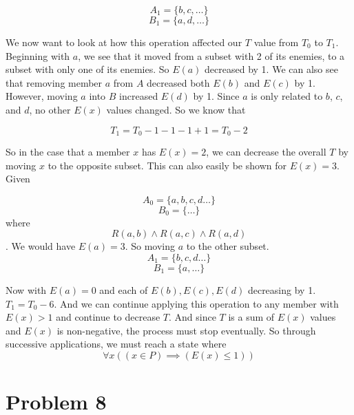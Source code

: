 \documentclass[12pt]{article}
\begin{document}
\[A_1 = \{b, c, \dots\}\]
\[B_1 = \{a, d, \dots\}\]

We now want to look at how this operation affected our $T$ value from $T_0$ to $T_1$. Beginning with $a$, we see that it moved from a subset with 2 of its enemies, to a subset with only one of its enemies. So $E(a)$ decreased by 1. We can also see that removing member $a$ from $A$ decreased both $E(b)$ and $E(c)$ by 1. However, moving $a$ into $B$ increased $E(d)$ by 1. Since $a$ is only related to $b$, $c$, and $d$, no other $E(x)$ values changed. So we know that

\[T_1 = T_0 - 1 - 1 - 1 + 1 = T_0 - 2\]

So in the case that a member $x$ has $E(x) = 2$, we can decrease the overall $T$ by moving $x$ to the opposite subset. This can also easily be shown for $E(x) = 3$. Given

\[A_0 = \{a, b, c, d\dots\}\]
\[B_0 = \{\dots\}\]
where \[R(a, b) \land R(a, c) \land R(a, d)\]. We would have $E(a) = 3$. So moving $a$ to the other subset.
\[A_1 = \{b, c, d\dots\}\]
\[B_1 = \{a, \dots\}\]

Now with $E(a)=0$ and each of $E(b), E(c), E(d)$ decreasing by 1. $T_1 = T_0 - 6$. And we can continue applying this operation to any member with $E(x) > 1$ and continue to decrease $T$. And since $T$ is a sum of $E(x)$ values and $E(x)$ is non-negative, the process must stop eventually. So through successive applications, we must reach a state where 
\[\forall x ((x \in P) \implies (E(x) \leq 1))\]




\newpage
\section*{Problem 8}
\\
\end{document}
